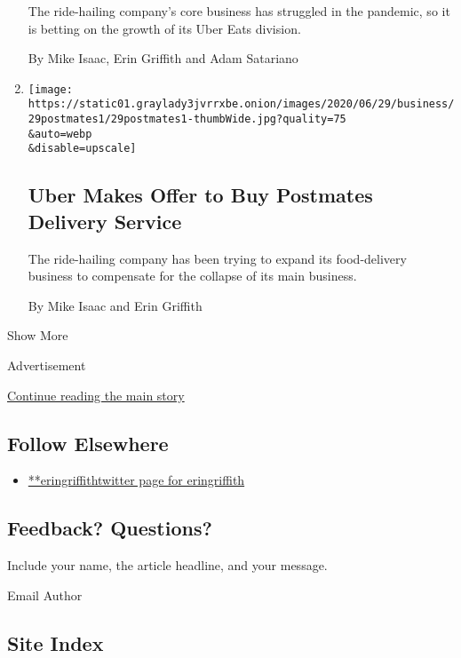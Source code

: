 \begin{enumerate}
  The ride-hailing company's core business has struggled in the
  pandemic, so it is betting on the growth of its Uber Eats division.

  By Mike Isaac, Erin Griffith and Adam Satariano
\item
  \href{/2020/06/29/technology/uber-postmates-buy-offer.html}{}

  \texttt{[image: https://static01.graylady3jvrrxbe.onion/images/2020/06/29/business/29postmates1/29postmates1-thumbWide.jpg?quality=75\\\&auto=webp\\\&disable=upscale]}

  \hypertarget{uber-makes-offer-to-buy-postmates-delivery-service}{%
  \subsection{Uber Makes Offer to Buy Postmates Delivery
  Service}\label{uber-makes-offer-to-buy-postmates-delivery-service}}

  The ride-hailing company has been trying to expand its food-delivery
  business to compensate for the collapse of its main business.

  By Mike Isaac and Erin Griffith
\end{enumerate}

Show More

Advertisement

\protect\hyperlink{after-mid2}{Continue reading the main story}

\hypertarget{follow-elsewhere}{%
\subsection{Follow Elsewhere}\label{follow-elsewhere}}

\begin{itemize}
\tightlist
\item
  \href{https://twitter.com/eringriffith}{**eringriffithtwitter page for
  eringriffith}
\end{itemize}

\hypertarget{feedback-questions}{%
\subsection{Feedback? Questions?}\label{feedback-questions}}

Include your name, the article headline, and your message.

Email Author

\hypertarget{site-index}{%
\subsection{Site Index}\label{site-index}}


